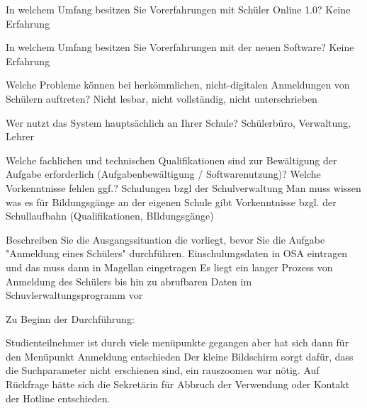 In welchem Umfang besitzen Sie Vorerfahrungen mit Schüler Online 1.0? 	
Keine Erfahrung					

In welchem Umfang besitzen Sie Vorerfahrungen mit der neuen Software?	
Keine Erfahrung		










Welche Probleme können bei herkömmlichen, nicht-digitalen Anmeldungen von Schülern auftreten?	
Nicht lesbar, nicht vollständig, nicht unterschrieben				








Wer nutzt das System hauptsächlich an Ihrer Schule?	
Schülerbüro, Verwaltung, Lehrer










Welche fachlichen und technischen Qualifikationen sind zur Bewältigung der Aufgabe erforderlich (Aufgabenbewältigung / Softwarenutzung)?
Welche Vorkenntnisse fehlen ggf.?	
Schulungen bzgl der Schulverwaltung
Man muss wissen was es für Bildungsgänge an der eigenen Schule gibt
Vorkenntnisse bzgl. der Schullaufbahn (Qualifikationen, BIldungsgänge)








Beschreiben Sie die Ausgangssituation die vorliegt, bevor Sie die Aufgabe "Anmeldung eines Schülers" durchführen.	
Einschulungsdaten in OSA eintragen und das muss dann in Magellan eingetragen
Es liegt ein langer Prozess von Anmeldung des Schülers bis hin zu abrufbaren Daten im Schuvlerwaltungsprogramm vor
	
















Zu Beginn der Durchführung:					


Studienteilnehmer ist durch viele menüpunkte gegangen aber hat sich dann für den Menüpunkt Anmeldung entschieden
Der kleine Bildschirm sorgt dafür, dass die Suchparameter nicht erschienen sind, ein rauszoomen war nötig. 
Auf Rückfrage hätte sich die Sekretärin für Abbruch der Verwendung oder Kontakt der Hotline entschieden. 		

